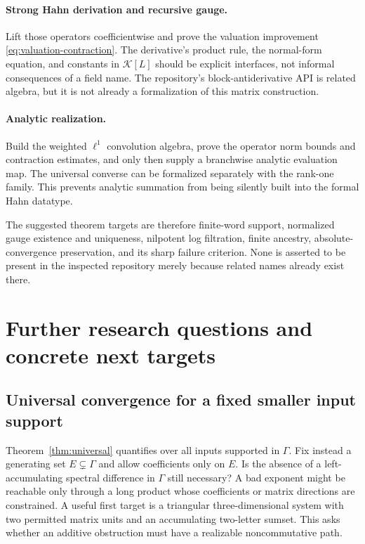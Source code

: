 \documentclass[11pt,a4paper]{article}
\numberwithin{equation}{section}
\theoremstyle{definition}
\theoremstyle{remark}
\newcommand{\K}{\mathcal K}
\newcommand{\G}{\Gamma}
\begin{document}
\paragraph{Strong Hahn derivation and recursive gauge.}
Lift those operators coefficientwise and prove the valuation improvement
\eqref{eq:valuation-contraction}. The derivative's product rule, the
normal-form equation, and constants in $\K[L]$ should be explicit
interfaces, not informal consequences of a field name. The repository's
block-antiderivative API is related algebra, but it is not already a
formalization of this matrix construction.

\paragraph{Analytic realization.}
Build the weighted $\ell^1$ convolution algebra, prove the operator norm
bounds and contraction estimates, and only then supply a branchwise
analytic evaluation map. The universal converse can be formalized
separately with the rank-one family. This prevents analytic summation from
being silently built into the formal Hahn datatype.

The suggested theorem targets are therefore finite-word support,
normalized gauge existence and uniqueness, nilpotent log filtration,
finite ancestry, absolute-convergence preservation, and its sharp failure
criterion. None is asserted to be present in the inspected repository
merely because related names already exist there.

\section{Further research questions and concrete next targets}
\label{sec:future}

\subsection{Universal convergence for a fixed smaller input support}
Theorem~\ref{thm:universal} quantifies over all inputs supported in $\G$.
Fix instead a generating set $E\subsetneq\G$ and allow coefficients only
on $E$. Is the absence of a left-accumulating spectral difference in $\G$
still necessary? A bad exponent might be reachable only through a long
product whose coefficients or matrix directions are constrained. A useful
first target is a triangular three-dimensional system with two permitted
matrix units and an accumulating two-letter sumset. This asks whether an
additive obstruction must have a realizable noncommutative path.
\end{document}
